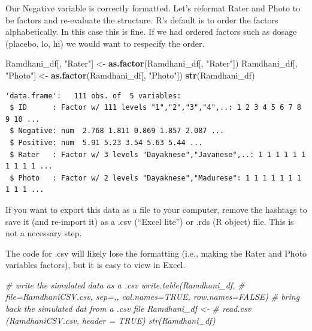 \documentclass[
  11pt,
]{book}
\newenvironment{Shaded}{\begin{snugshade}}{\end{snugshade}}
\newcommand{\CommentTok}[1]{\textcolor[rgb]{0.37,0.37,0.37}{\textit{#1}}}
\newcommand{\FunctionTok}[1]{\textcolor[rgb]{0.27,0.27,0.27}{\textbf{#1}}}
\newcommand{\NormalTok}[1]{#1}
\newcommand{\OtherTok}[1]{\textcolor[rgb]{0.37,0.37,0.37}{#1}}
\newcommand{\StringTok}[1]{\textcolor[rgb]{0.5,0.5,0.5}{#1}}
\begin{document}
Our Negative variable is correctly formatted. Let's reformat Rater and Photo to be factors and re-evaluate the structure. R's default is to order the factors alphabetically. In this case this is fine. If we had ordered factors such as dosage (placebo, lo, hi) we would want to respecify the order.

\begin{Shaded}
\begin{Highlighting}[]
\NormalTok{Ramdhani\_df[, }\StringTok{"Rater"}\NormalTok{] }\OtherTok{\textless{}{-}} \FunctionTok{as.factor}\NormalTok{(Ramdhani\_df[, }\StringTok{"Rater"}\NormalTok{])}
\NormalTok{Ramdhani\_df[, }\StringTok{"Photo"}\NormalTok{] }\OtherTok{\textless{}{-}} \FunctionTok{as.factor}\NormalTok{(Ramdhani\_df[, }\StringTok{"Photo"}\NormalTok{])}
\FunctionTok{str}\NormalTok{(Ramdhani\_df)}
\end{Highlighting}
\end{Shaded}

\begin{verbatim}
'data.frame':   111 obs. of  5 variables:
 $ ID      : Factor w/ 111 levels "1","2","3","4",..: 1 2 3 4 5 6 7 8 9 10 ...
 $ Negative: num  2.768 1.811 0.869 1.857 2.087 ...
 $ Positive: num  5.91 5.23 3.54 5.63 5.44 ...
 $ Rater   : Factor w/ 3 levels "Dayaknese","Javanese",..: 1 1 1 1 1 1 1 1 1 1 ...
 $ Photo   : Factor w/ 2 levels "Dayaknese","Madurese": 1 1 1 1 1 1 1 1 1 1 ...
\end{verbatim}

If you want to export this data as a file to your computer, remove the hashtags to save it (and re-import it) as a .csv (``Excel lite'') or .rds (R object) file. This is not a necessary step.

The code for .csv will likely lose the formatting (i.e., making the Rater and Photo variables factors), but it is easy to view in Excel.

\begin{Shaded}
\begin{Highlighting}[]
\CommentTok{\# write the simulated data as a .csv write.table(Ramdhani\_df,}
\CommentTok{\# file=\textquotesingle{}RamdhaniCSV.csv\textquotesingle{}, sep=\textquotesingle{},\textquotesingle{}, col.names=TRUE, row.names=FALSE)}
\CommentTok{\# bring back the simulated dat from a .csv file Ramdhani\_df \textless{}{-}}
\CommentTok{\# read.csv (\textquotesingle{}RamdhaniCSV.csv\textquotesingle{}, header = TRUE) str(Ramdhani\_df)}
\end{Highlighting}
\end{Shaded}
\end{document}
